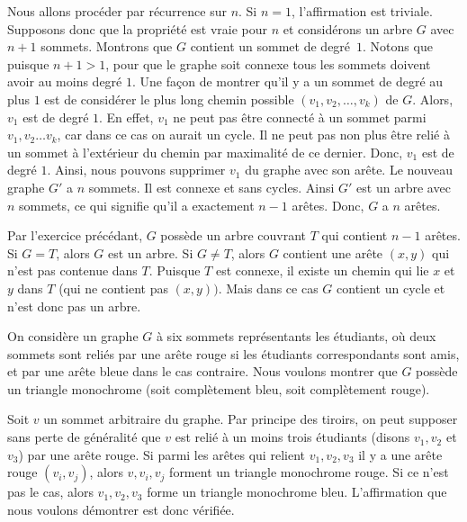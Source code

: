  
\begin{sol}


Nous allons procéder par récurrence sur $n$. Si $n = 1$, l'affirmation est triviale. Supposons donc que la propriété est vraie pour $n$ et considérons un arbre $G$ avec $n+1$ sommets. Montrons que $G$ contient un sommet de degré~$1$. Notons que puisque $n + 1 > 1$, pour que le graphe soit connexe tous les sommets doivent avoir au moins degré $1$. Une façon de montrer qu'il y a un sommet de degré au plus $1$ est de considérer le plus long chemin possible $(v_1, v_2, \ldots, v_k)$ de $G$. Alors, $v_1$ est de degré $1$. En effet, $v_1$ ne peut pas être connecté à un sommet parmi $v_1,v_2 \ldots v_k$, car dans ce cas on aurait un cycle. Il ne peut pas non plus être relié à un sommet à l’extérieur du chemin par maximalité de ce dernier. Donc, $v_1$ est de degré $1$. Ainsi, nous pouvons supprimer $v_1$ du graphe avec son arête.
Le nouveau graphe $G'$ a $n$ sommets. Il est connexe et sans cycles. Ainsi $G'$ est un arbre avec $n$ sommets, ce qui signifie qu'il a exactement $n-1$ arêtes. Donc, $G$ a $n$ arêtes.\\

\end{sol}


\begin{sol}

 Par l’exercice précédant, $G$ possède un arbre couvrant $T$ qui contient $n-1$ arêtes. Si $G=T$, alors $G$ est un arbre. Si $G \neq T$, alors $G$ contient une arête $(x,y)$ qui n’est pas contenue dans $T$. Puisque $T$ est connexe, il existe un chemin qui lie $x$ et $y$ dans $T$ (qui ne contient pas $(x,y))$. Mais dans ce cas $G$ contient un cycle et n’est donc pas un arbre.\\
 
 \end{sol}

\begin{sol}




On considère un graphe $G$ à six sommets représentants les étudiants, où deux sommets sont reliés par une arête rouge si les étudiants correspondants sont amis, et par une arête bleue dans le cas contraire. Nous voulons montrer que $G$ possède un triangle monochrome (soit complètement bleu, soit complètement rouge). 

Soit $v$ un sommet arbitraire du graphe. Par principe des tiroirs, on peut supposer sans perte de généralité que $v$ est relié à un moins trois étudiants (disons $v_1, v_2 $ et $v_3$) par une arête rouge. Si parmi les arêtes qui relient $v_1, v_2, v_3$ il y a une arête rouge $(v_i,v_j)$, alors $v,v_i,v_j$ forment un triangle monochrome rouge. Si ce n’est pas le cas, alors $v_1,v_2,v_3$ forme un triangle monochrome bleu. L’affirmation que nous voulons démontrer est donc vérifiée.

\end{sol}





